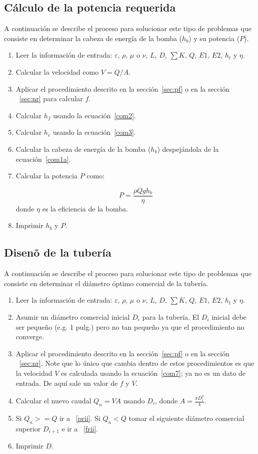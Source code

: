 \documentclass[10pt, oneside]{article}
\begin{document}
\subsection{C\'alculo de la potencia requerida}\label{tubeSimplePoten}
A continuaci\'on se describe el proceso para solucionar este tipo de problemas que consiste en determinar la cabeza de energ\'ia de la bomba ($h_b$) y su potencia  ($P$).
\begin{enumerate} 
\item Leer la informaci\'on de entrada: $\varepsilon$, $\rho$, $\mu$ o $\nu$, $L$, $D$, $\sum K$, $Q$, $E1$, $E2$, $h_t$ y $\eta$.
\item Calcular la velocidad como $V=Q/A$.
\item Aplicar el procedimiento descrito en la secci\'on~\ref{sec:pf} o en la secci\'on ~\ref{sec:nr} para calcular $f$.
\item Calcular $h_f$ usando la ecuaci\'on~\ref{com2}.
\item Calcular $h_e$ usando la ecuaci\'on~\ref{com3}.
\item Calcular la cabeza de energ\'ia de la bomba ($h_b$) despej\'andola de la ecuaci\'on~\ref{com1a}.
\item Calcular la potencia $P$ como:

\begin{equation}
P = \frac{\rho Q g h_b}{\eta}
\label{com12a}
\end{equation}
donde $\eta$ es la eficiencia de la bomba.

\item Imprimir $h_b$ y $P$.
\end{enumerate} 

\subsection{Disen\~o de la  tuber\'ia}\label{tubeSimpleDesign}
A continuaci\'on se describe el proceso para solucionar este tipo de problemas que consiste en determinar el di\'ametro \'optimo comercial de la tuber\'ia.
\begin{enumerate} 
\item Leer la informaci\'on de entrada: $\varepsilon$, $\rho$, $\mu$ o $\nu$, $L$, $D$, $\sum K$, $Q$, $E1$, $E2$, $h_t$ y $\eta$.
\item Asumir un di\'ametro comercial inicial $D_i$ para la tuber\'ia. El $D_i$ inicial debe ser peque\~no (e.g. 1 pulg.) pero no tan peque\~no ya que el procedimiento no converge.
\item \label{frii} Aplicar el procedimiento descrito en la secci\'on~\ref{sec:pf} o en la secci\'on ~\ref{sec:nr}. Note que lo \'unico que cambia dentro de estos procedimientos es que la velocidad $V$ es calculada usando la ecuaci\'on~\ref{com7}; ya no es un dato de entrada. De aqu\'i sale un valor de $f$ y $V$.
\item Calcular el nuevo caudal $Q_n =VA$ usando $D_i$, donde $A=\frac{\pi D_i^2}{4}$.
\item Si $Q_n >= Q $ ir a ~\ref{prii}. Si $Q_n < Q$ tomar el siguiente di\'ametro comercial superior $D_{i+1}$ e ir a ~\ref{frii}.
\item \label{prii} Imprimir $D$.
\end{enumerate} 
\end{document}
